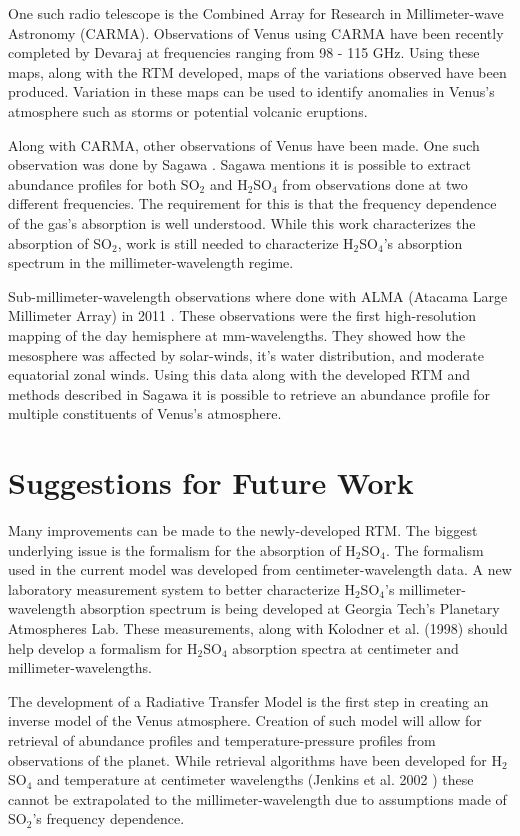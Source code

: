 One such radio telescope is the Combined Array for Research in Millimeter-wave Astronomy (CARMA). Observations of Venus using CARMA have been recently completed by Devaraj \cite{Devaraj-CARMA} at frequencies ranging from 98 - 115 GHz. Using these maps, along with the RTM developed, maps of the variations observed have been produced. Variation in these maps can be used to identify anomalies in Venus's atmosphere such as storms or potential volcanic eruptions.

Along with CARMA, other observations of Venus have been made. One such observation was done by Sagawa \cite{Sagawa-2008}. Sagawa mentions it is possible to extract abundance profiles for both SO$_2$ and H$_2$SO$_4$ from observations done at two different frequencies. The requirement for this is that the frequency dependence of the gas's absorption is well understood. While this work characterizes the absorption of SO$_2$, work is still needed to characterize H$_2$SO$_4$'s absorption spectrum in the millimeter-wavelength regime. 

Sub-millimeter-wavelength observations where done with ALMA (Atacama Large Millimeter Array) in 2011 \cite{ALMA-2013}. These observations were the first high-resolution mapping of the day hemisphere at mm-wavelengths. They showed how the mesosphere was affected by solar-winds, it's water distribution, and moderate equatorial zonal winds. Using this data along with the developed RTM and methods described in Sagawa \cite{Sagawa-2008} it is possible to retrieve an abundance profile for multiple constituents of Venus's atmosphere.

\section{Suggestions for Future Work}
Many improvements can be made to the newly-developed RTM. The biggest underlying issue is the formalism for the absorption of H$_2$SO$_4$. The formalism used in the current model was developed from centimeter-wavelength data. A new laboratory measurement system to better characterize H$_2$SO$_4$'s millimeter-wavelength absorption spectrum is being developed at Georgia Tech's Planetary Atmospheres Lab. These measurements, along with Kolodner et al. (1998) \cite{Kolodner-1998} should help develop a formalism for H$_2$SO$_4$ absorption spectra at centimeter and millimeter-wavelengths. 

The development of a Radiative Transfer Model is the first step in creating an inverse model of the Venus atmosphere. Creation of such model will allow for retrieval of abundance profiles and temperature-pressure profiles from observations of the planet. While retrieval algorithms have been developed for H$_2$SO$_4$ and temperature at centimeter wavelengths (Jenkins et al. 2002 \cite{Jenkins-2002}) these cannot be extrapolated to the millimeter-wavelength due to assumptions made of SO$_2$'s frequency dependence.